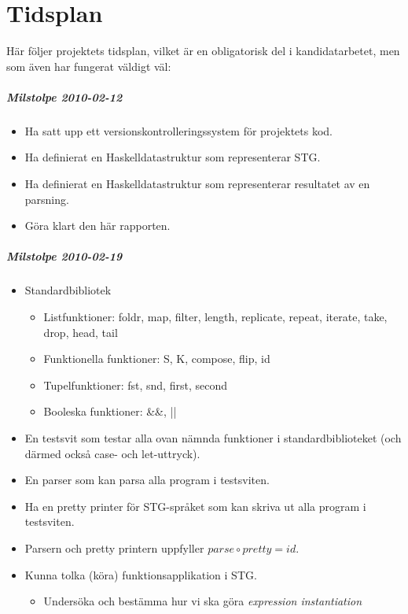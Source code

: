 \documentclass[../Appendix]{subfiles}
\begin{document}
\chapter{Tidsplan}

Här följer projektets tidsplan, vilket är en obligatorisk del i kandidatarbetet,
men som även har fungerat väldigt väl: 

\paragraph{Milstolpe 2010-02-12 }
\begin{itemize}
\item Ha satt upp ett versionskontrolleringssystem för projektets kod.
\item Ha definierat en Haskelldatastruktur som representerar STG.
\item Ha definierat en Haskelldatastruktur som representerar resultatet
av en parsning.
\item Göra klart den här rapporten.
\end{itemize}

\paragraph{Milstolpe 2010-02-19}
\begin{itemize}
\item Standardbibliotek

\begin{itemize}
\item Listfunktioner: foldr, map, filter, length, replicate, repeat, iterate,
take, drop, head, tail
\item Funktionella funktioner: S, K, compose, flip, id
\item Tupelfunktioner: fst, snd, first, second
\item Booleska funktioner: \&\&, ||
\end{itemize}
\item En testsvit som testar alla ovan nämnda funktioner i standardbiblioteket
(och därmed också case- och let-uttryck).
\item En parser som kan parsa alla program i testsviten.
\item Ha en pretty printer för STG-språket som kan skriva ut alla program
i testsviten.
\item Parsern och pretty printern uppfyller $parse\circ pretty=id$.
\item Kunna tolka (köra) funktionsapplikation i STG.

\begin{itemize}
\item Undersöka och bestämma hur vi ska göra \textit{expression instantiation}%
\end{itemize}
\end{itemize}
\end{document}
